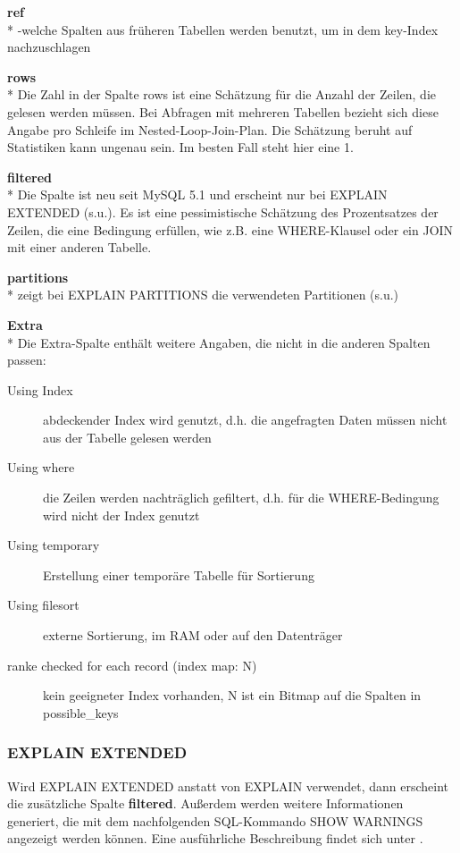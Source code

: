 \textbf{ref}\\*
-welche Spalten aus früheren Tabellen werden benutzt, um in dem key-Index nachzuschlagen

\textbf{rows}\\*
Die Zahl in der Spalte rows ist eine Schätzung für die Anzahl der Zeilen, die gelesen werden müssen.
Bei Abfragen mit mehreren Tabellen bezieht sich diese Angabe pro Schleife im Nested-Loop-Join-Plan.
Die Schätzung beruht auf Statistiken kann ungenau sein. Im besten Fall steht hier eine 1.

\textbf{filtered}\\*
Die Spalte ist neu seit MySQL 5.1 und erscheint nur bei EXPLAIN EXTENDED (s.u.).
Es ist eine pessimistische Schätzung des Prozentsatzes der Zeilen, die eine Bedingung erfüllen, wie z.B. eine WHERE-Klausel oder ein JOIN mit einer anderen Tabelle.

\textbf{partitions}\\*
zeigt bei EXPLAIN PARTITIONS die verwendeten Partitionen (s.u.)

\textbf{Extra}\\*
Die Extra-Spalte enthält weitere Angaben, die nicht in die anderen Spalten passen:
\begin{description}
\item[Using Index] abdeckender Index wird genutzt, d.h. die angefragten Daten müssen nicht aus der Tabelle gelesen werden
\item[Using where] die Zeilen werden nachträglich gefiltert, d.h. für die WHERE-Bedingung wird nicht der Index genutzt
\item[Using temporary] Erstellung einer temporäre Tabelle für Sortierung 
\item[Using filesort] externe Sortierung, im RAM oder auf den Datenträger
\item[ranke checked for each record (index map: N)] kein geeigneter Index vorhanden, N ist ein Bitmap auf die Spalten in possible\_keys
\end{description}

\subsubsection{EXPLAIN EXTENDED}
Wird EXPLAIN EXTENDED anstatt von EXPLAIN verwendet, dann erscheint die zusätzliche Spalte \textbf{filtered}.
Außerdem werden weitere Informationen generiert, die mit dem nachfolgenden SQL-Kommando SHOW WARNINGS angezeigt werden können.
Eine ausführliche Beschreibung findet sich unter \cite{refman3}.

